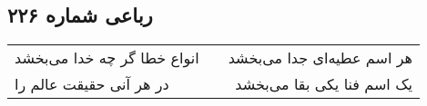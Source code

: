 \begin{center}
\section*{رباعی شماره ۲۲۶}
\label{sec:sh226}
\begin{longtable}{l p{0.5cm} r}
انواع خطا گر چه خدا می‌بخشد
&&
هر اسم عطیه‌ای جدا می‌بخشد
\\
در هر آنی حقیقت عالم را
&&
یک اسم فنا یکی بقا می‌بخشد
\\
\end{longtable}
\end{center}
